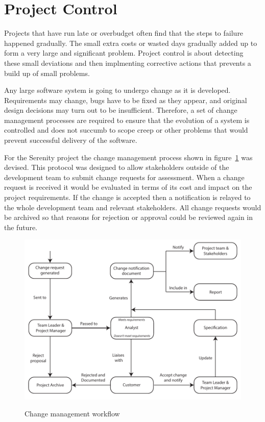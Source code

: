 \section{Project Control}
\label{sec:control}


Projects that have run late or overbudget often find that the steps to failure happened gradually.
The small extra costs or wasted days gradually added up to form a very large and significant
problem. Project control is about detecting these small deviations and then implmenting corrective
actions that prevents a build up of small problems.

Any large software system is going to undergo change as it is developed. Requirements may change,
bugs have to be fixed as they appear, and original design decisions may turn out to be insufficient.
Therefore, a set of change management processes are required to ensure that the evolution of a
system is controlled and does not succumb to scope creep or other problems that would prevent
successful delivery of the software.

For the Serenity project the change management process shown in figure~\ref{fig:change_management}
was devised. This protocol was designed to allow stakeholders outside of the development team
to submit change requests for assessment. When a change request is received it would be evaluated
in terms of its cost and impact on the project requirements. If the change is accepted then a
notification is relayed to the whole development team and relevant stakeholders. All change requests
would be archived so that reasons for rejection or approval could be reviewed again in the future.

\begin{figure}
	\includegraphics{res/change_management_diagram}
	\label{fig:change_management}
	\caption{Change management workflow}
\end{figure}

